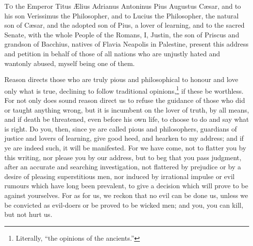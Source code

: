 

\textsc{To} the Emperor Titus Ælius Adrianus Antoninus Pius Augustus Cæsar, and to his son Verissimus the Philosopher, and to Lucius the Philosopher, the natural son of Cæsar, and the adopted son of Pius, a lover of learning, and to the sacred Senate, with the whole People of the Romans, I, Justin, the son of Priscus and grandson of Bacchius, natives of Flavia Neapolis in Palestine, present this address and petition in behalf of those of all nations who are unjustly hated and wantonly abused, myself being one of them.


Reason directs those who are truly pious and philosophical to honour and love only what is true, declining to follow traditional opinions,\footnote{Literally, “the opinions of the ancients.”} if these be worthless. For not only does sound reason direct us to refuse the guidance of those who did or taught anything wrong, but it is incumbent on the lover of truth, by all means, and if death be threatened, even before his own life, to choose to do and say what is right. Do you, then, since ye are called pious and philosophers, guardians of justice and lovers of learning, give good heed, and hearken to my address; and if ye are indeed such, it will be manifested. For we have come, not to flatter you by this writing, nor please you by our address, but to beg that you pass judgment, after an accurate and searching investigation, not flattered by prejudice or by a desire of pleasing superstitious men, nor induced by irrational impulse or evil rumours which have long been prevalent, to give a decision which will prove to be against yourselves. For as for us, we reckon that no evil can be done us, unless we be convicted as evil-doers or be proved to be wicked men; and you, you can kill, but not hurt us.


